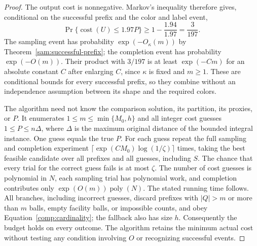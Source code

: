 \begin{proof}
The output cost is nonnegative.  Markov's inequality therefore gives,
conditional on the successful prefix and the color and label event,
\[
 \Pr\{\operatorname{cost}(U)\le1.97P\}
 \ge 1-\frac{1.94}{1.97}=\frac3{197}.
\]
The sampling event has probability $\exp(-O_\kappa(m))$ by
Theorem~\ref{sam:successful-prefix}; the completion event has probability
$\exp(-O(m))$.  Their product with $3/197$ is at least
$\exp(-C m)$ for an absolute constant $C$ after enlarging $C$, since
$\kappa$ is fixed and $m\ge1$.  These are conditional bounds for every
successful prefix, so they combine without an independence assumption
between its shape and the required colors.

The algorithm need not know the comparison solution, its partition,
its proxies, or $P$.  It enumerates $1\le m\le\min\{M_0,h\}$ and
all integer cost guesses $1\le P\le n\Delta$, where $\Delta$ is the
maximum original distance of the bounded integral instance.  One guess
equals the true $P$.  For each guess repeat the full sampling and
completion experiment
$\lceil\exp(C M_0)\log(1/\zeta)\rceil$ times, taking the best feasible
candidate over all prefixes and all guesses, including $S$.
The chance that every trial for the correct guess fails is at most
$\zeta$.  The number of cost guesses is polynomial in $N$, each
sampling trial has polynomial work, and completion contributes only
$\exp(O(m))\operatorname{poly}(N)$.  The stated running time follows.
All branches, including incorrect guesses, discard prefixes with
$|Q|>m$ or more than $m$ balls, empty facility balls, or impossible
counts, and obey Equation~\eqref{comp:cardinality};
the fallback also has size $h$.  Consequently the budget holds on
every outcome.  The algorithm retains the minimum actual cost without
testing any condition involving $O$ or recognizing successful events.
\end{proof}
